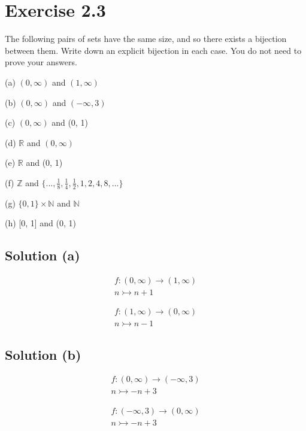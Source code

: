 \documentclass[12pt]{report}
\begin{document}
\section{Exercise 2.3}
The following pairs of sets have the same size, and  so there exists a bijection between them. Write down an explicit  bijection in each case. You do not need to prove your answers.  
\begin{multicols}{2}
    (a) $(0, \infty)$ and $(1, \infty)$ 

    (b) $(0, \infty)$ and $(-\infty, 3)$

    (c) $(0, \infty)$ and (0, 1) 

    (d) $\mathbb{R}$ and $(0, \infty)$  
    \columnbreak

    (e) $\mathbb{R}$ and (0, 1) 
    
    (f) $\mathbb{Z}$ and $\{ ..., \frac{1}{8}, \frac{1}{4}, \frac{1}{2}, 1, 2, 4, 8, ... \}$  
    
    (g) $\{0, 1\} \times \mathbb{N}$ and $\mathbb{N}$  
    
    (h) [0, 1] and (0, 1) 
\end{multicols}

\subsection{Solution (a)}
\begin{multicols}{2}
    \begin{gather}
        f : (0,\infty) \to (1,\infty)\\
        n \rightarrowtail n + 1
    \end{gather}
    
    \columnbreak
    \begin{gather}
        f : (1,\infty) \to (0,\infty)\\
        n \rightarrowtail n - 1
    \end{gather}
\end{multicols}

\subsection{Solution (b)}
\begin{multicols}{2}
    \begin{gather}
        f : (0,\infty) \to (-\infty, 3)\\
        n \rightarrowtail -n + 3
    \end{gather}

    \columnbreak
    \begin{gather}
        f : (-\infty, 3) \to (0,\infty)\\
        n \rightarrowtail -n + 3
    \end{gather}
    
\end{multicols}
\end{document}

